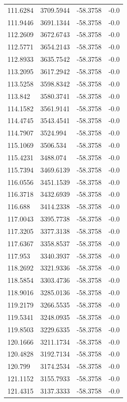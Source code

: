 \begin{table}[H]
\begin{tabular}{llll}
111.6284 & 3709.5944 & -58.3758 & -0.0 \\
111.9446 & 3691.1344 & -58.3758 & -0.0 \\
112.2609 & 3672.6743 & -58.3758 & -0.0 \\
112.5771 & 3654.2143 & -58.3758 & -0.0 \\
112.8933 & 3635.7542 & -58.3758 & -0.0 \\
113.2095 & 3617.2942 & -58.3758 & -0.0 \\
113.5258 & 3598.8342 & -58.3758 & -0.0 \\
113.842 & 3580.3741 & -58.3758 & -0.0 \\
114.1582 & 3561.9141 & -58.3758 & -0.0 \\
114.4745 & 3543.4541 & -58.3758 & -0.0 \\
114.7907 & 3524.994 & -58.3758 & -0.0 \\
115.1069 & 3506.534 & -58.3758 & -0.0 \\
115.4231 & 3488.074 & -58.3758 & -0.0 \\
115.7394 & 3469.6139 & -58.3758 & -0.0 \\
116.0556 & 3451.1539 & -58.3758 & -0.0 \\
116.3718 & 3432.6939 & -58.3758 & -0.0 \\
116.688 & 3414.2338 & -58.3758 & -0.0 \\
117.0043 & 3395.7738 & -58.3758 & -0.0 \\
117.3205 & 3377.3138 & -58.3758 & -0.0 \\
117.6367 & 3358.8537 & -58.3758 & -0.0 \\
117.953 & 3340.3937 & -58.3758 & -0.0 \\
118.2692 & 3321.9336 & -58.3758 & -0.0 \\
118.5854 & 3303.4736 & -58.3758 & -0.0 \\
118.9016 & 3285.0136 & -58.3758 & -0.0 \\
119.2179 & 3266.5535 & -58.3758 & -0.0 \\
119.5341 & 3248.0935 & -58.3758 & -0.0 \\
119.8503 & 3229.6335 & -58.3758 & -0.0 \\
120.1666 & 3211.1734 & -58.3758 & -0.0 \\
120.4828 & 3192.7134 & -58.3758 & -0.0 \\
120.799 & 3174.2534 & -58.3758 & -0.0 \\
121.1152 & 3155.7933 & -58.3758 & -0.0 \\
121.4315 & 3137.3333 & -58.3758 & -0.0 \\

\end{tabular}
\end{table}
